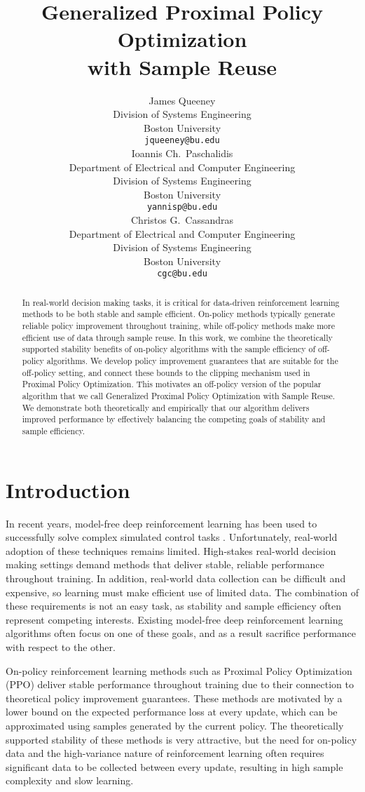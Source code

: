 \documentclass{article}
\title{Generalized Proximal Policy Optimization\\with Sample Reuse}
\author{%
   James Queeney \\
   Division of Systems Engineering \\
   Boston University \\
   \texttt{jqueeney@bu.edu} \\
   \And
   Ioannis Ch.~Paschalidis \\
   Department of Electrical and Computer Engineering \\
   Division of Systems Engineering \\
   Boston University \\
   \texttt{yannisp@bu.edu} \\
   \And
   Christos G.~Cassandras \\
   Department of Electrical and Computer Engineering \\
   Division of Systems Engineering \\
   Boston University \\
   \texttt{cgc@bu.edu} \\
}
\begin{document}
\maketitle

\begin{abstract}
In real-world decision making tasks, it is critical for data-driven reinforcement learning methods to be both stable and sample efficient. On-policy methods typically generate reliable policy improvement throughout training, while off-policy methods make more efficient use of data through sample reuse. In this work, we combine the theoretically supported stability benefits of on-policy algorithms with the sample efficiency of off-policy algorithms. We develop policy improvement guarantees that are suitable for the off-policy setting, and connect these bounds to the clipping mechanism used in Proximal Policy Optimization. This motivates an off-policy version of the popular algorithm that we call Generalized Proximal Policy Optimization with Sample Reuse. We demonstrate both theoretically and empirically that our algorithm delivers improved performance by effectively balancing the competing goals of stability and sample efficiency.
\end{abstract}


\section{Introduction}

In recent years, model-free deep reinforcement learning has been used to successfully solve complex simulated control tasks \citep{duan_2016}. Unfortunately, real-world adoption of these techniques remains limited. High-stakes real-world decision making settings demand methods that deliver stable, reliable performance throughout training. In addition, real-world data collection can be difficult and expensive, so learning must make efficient use of limited data. The combination of these requirements is not an easy task, as stability and sample efficiency often represent competing interests. Existing model-free deep reinforcement learning algorithms often focus on one of these goals, and as a result sacrifice performance with respect to the other.

On-policy reinforcement learning methods such as Proximal Policy Optimization (PPO) \citep{schulman_2017} deliver stable performance throughout training due to their connection to theoretical policy improvement guarantees. These methods are motivated by a lower bound on the expected performance loss at every update, which can be approximated using samples generated by the current policy. The theoretically supported stability of these methods is very attractive, but the need for on-policy data and the high-variance nature of reinforcement learning often requires significant data to be collected between every update, resulting in high sample complexity and slow learning.
\end{document}
